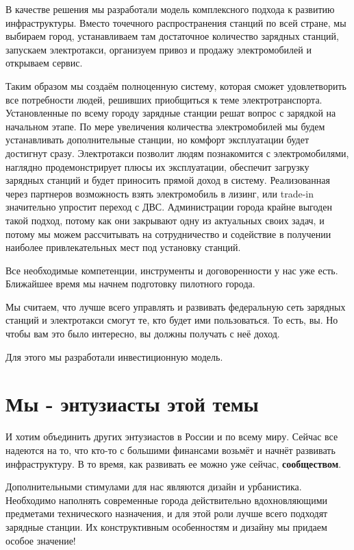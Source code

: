 \documentclass[a4paper,12pt]{report}
\begin{document}
В качестве решения мы разработали модель комплексного подхода к развитию инфраструктуры. Вместо точечного распространения станций по всей стране, мы выбираем город, устанавливаем там достаточное количество зарядных станций, запускаем электротакси, организуем привоз и продажу электромобилей и открываем сервис. 

Таким образом мы создаём полноценную систему, которая сможет удовлетворить все потребности людей, решивших приобщиться к теме электротранспорта. Установленные по всему городу зарядные станции решат вопрос с зарядкой на начальном этапе. По мере увеличения количества электромобилей мы будем устанавливать дополнительные станции, но комфорт эксплуатации будет достигнут сразу. Электротакси позволит людям познакомится с электромобилями, наглядно продемонстрирует плюсы их эксплуатации, обеспечит загрузку зарядных станций и будет приносить прямой доход в систему. Реализованная через партнеров возможность взять электромобиль в лизинг, или trade-in значительно упростит переход с ДВС. Администрации города крайне выгоден такой подход, потому как они закрывают одну из актуальных своих задач, и потому мы можем рассчитывать на сотрудничество и содействие в получении наиболее привлекательных мест под установку станций. 

Все необходимые компетенции, инструменты и договоренности у нас уже есть. Ближайшее время мы начнем подготовку пилотного города. 

Мы считаем, что лучше всего управлять и развивать федеральную сеть зарядных станций и электротакси смогут те, кто будет ими пользоваться. То есть, вы. Но чтобы вам это было интересно, вы должны получать с неё доход. 

Для этого мы разработали инвестиционную модель. 



\chapter{Мы - энтузиасты этой темы}
И хотим объединить других энтузиастов в России и по всему миру. Сейчас все надеются на то, что кто-то с большими финансами возьмёт и начнёт развивать инфраструктуру. В то время, как развивать ее можно уже сейчас, \textbf{сообществом}. 

Дополнительными стимулами для нас являются дизайн и урбанистика. Необходимо наполнять современные города действительно вдохновляющими предметами технического назначения, и для этой роли лучше всего подходят зарядные станции. Их конструктивным особенностям и дизайну мы придаем особое значение!
\end{document}
